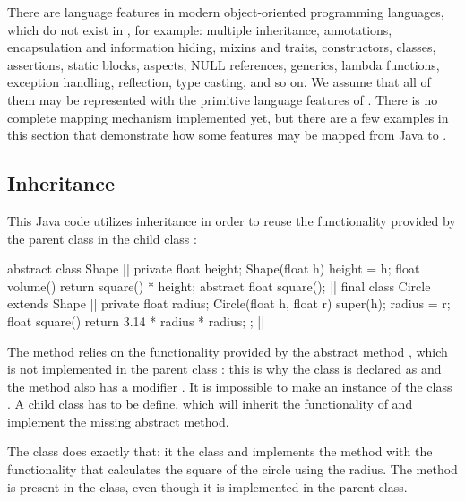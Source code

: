 There are language features in modern object-oriented programming
languages, which do not exist in \eo{}, for example:
  multiple inheritance,
  annotations,
  encapsulation and information hiding,
  mixins and traits,
  constructors,
  classes,
  assertions,
  static blocks,
  aspects,
  NULL references,
  generics,
  lambda functions,
  exception handling,
  reflection,
  type casting,
  and so on.
We assume that all of them may be represented with the primitive
language features of \eo{}. There is no complete mapping mechanism
implemented yet, but there are a few examples in this section
that demonstrate how some features may be mapped from Java to \eo{}.

\subsection{Inheritance}

This Java code utilizes inheritance in order to reuse the functionality
provided by the parent class  in the child class :

\begin{twocols}
\begin{ffcode}
abstract class Shape { |$\label{ln:java-shape}$|
  private float height;
  Shape(float h) {
    height = h;
  }
  float volume() {
    return square() * height;
  }
  abstract float square();
} |$\label{ln:java-shape-end}$|
final class Circle extends Shape { |$\label{ln:java-cicle}$|
  private float radius;
  Circle(float h, float r) {
    super(h);
    radius = r;
  }
  float square() {
    return 3.14 * radius * radius;
  }
}; |$\label{ln:java-circle-end}$|
\end{ffcode}
\end{twocols}

The method  relies on the functionality provided by the
abstract method , which is not implemented in the parent
class : this is why the class is declared as 
and the method  also has a modifier .
It is impossible to make an instance of the class . A child
class has to be define, which will inherit the functionality of
 and implement the missing abstract method.

The class  does exactly that: it  the class
 and implements the method  with the functionality
that calculates the square of the circle using the radius.
The method  is present in the  class, even
though it is implemented in the parent class.

